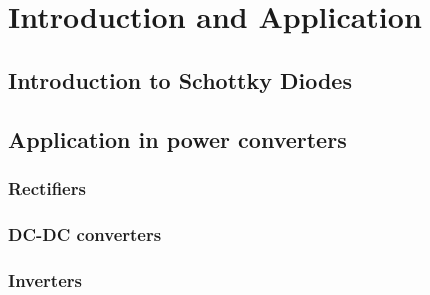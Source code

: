 \section{Introduction and Application}
\subsection{Introduction to Schottky Diodes}
\subsection{Application in power converters}
\subsubsection{Rectifiers}
\subsubsection{DC-DC converters}
\subsubsection{Inverters}
